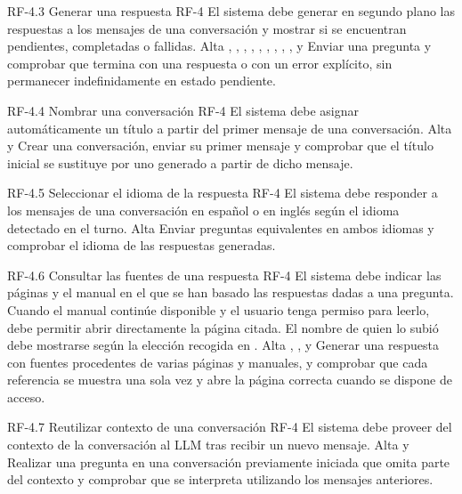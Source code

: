 \requisitoFuncional
{RF-4.3}
{Generar una respuesta}
{}
{RF-4}
{El sistema debe generar en segundo plano las respuestas a los mensajes de una
conversación y mostrar si se encuentran pendientes, completadas o fallidas.}
{Alta}
{, , ,
, , ,
, , ,
 y }
{Enviar una pregunta y comprobar que termina con una respuesta o con un error
explícito, sin permanecer indefinidamente en estado pendiente.}

\requisitoFuncional
{RF-4.4}
{Nombrar una conversación}
{}
{RF-4}
{El sistema debe asignar automáticamente un título a partir del primer mensaje
de una conversación.}
{Alta}
{ y }
{Crear una conversación, enviar su primer mensaje y comprobar que el título
inicial se sustituye por uno generado a partir de dicho mensaje.}

\requisitoFuncional
{RF-4.5}
{Seleccionar el idioma de la respuesta}
{}
{RF-4}
{El sistema debe responder a los mensajes de una conversación en español o en
inglés según el idioma detectado en el turno.}
{Alta}
{}
{Enviar preguntas equivalentes en ambos idiomas y comprobar el idioma de las
respuestas generadas.}

\requisitoFuncional
{RF-4.6}
{Consultar las fuentes de una respuesta}
{}
{RF-4}
{El sistema debe indicar las páginas y el manual en el que se han basado
las respuestas dadas a una pregunta. Cuando el manual continúe disponible
y el usuario tenga permiso para leerlo, debe permitir abrir directamente
la página citada. El nombre de quien lo subió debe mostrarse según la
elección recogida en .}
{Alta}
{, ,  y }
{Generar una respuesta con fuentes procedentes de varias páginas y manuales, y
comprobar que cada referencia se muestra una sola vez y abre la página correcta
cuando se dispone de acceso.}

\requisitoFuncional
{RF-4.7}
{Reutilizar contexto de una conversación}
{}
{RF-4}
{El sistema debe proveer del contexto de la conversación al \ac{LLM} tras
recibir un nuevo mensaje.}
{Alta}
{ y }
{Realizar una pregunta en una conversación previamente iniciada que omita parte del contexto y comprobar
que se interpreta utilizando los mensajes anteriores.}

